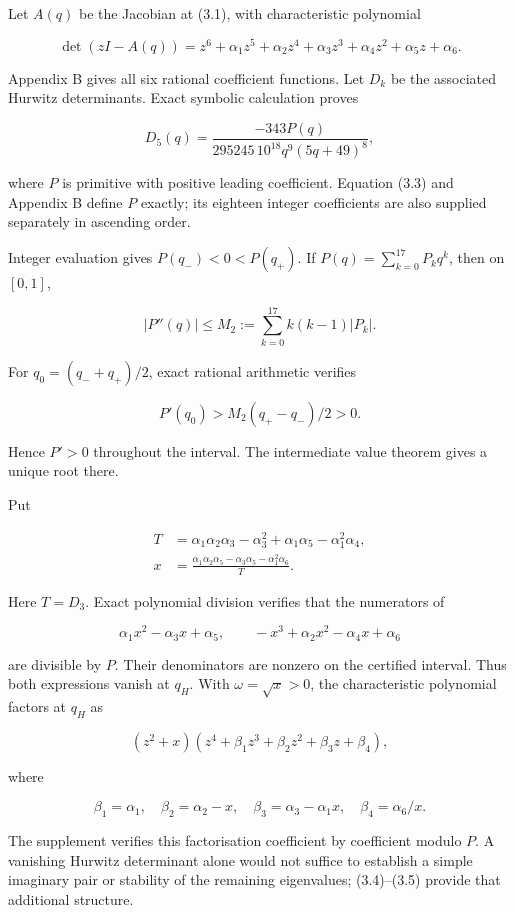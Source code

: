 \documentclass[
  11pt,
]{article}
\begin{document}
Let \(A(q)\) be the Jacobian at (3.1), with characteristic polynomial

\[
\det(zI-A(q))=z^6+\alpha_1z^5+\alpha_2z^4+\alpha_3z^3
+\alpha_4z^2+\alpha_5z+\alpha_6.
\]

Appendix B gives all six rational coefficient functions. Let \(D_k\) be
the associated Hurwitz determinants. Exact symbolic calculation proves

\[
D_5(q)=\frac{-343P(q)}{295245\,10^{18}q^9(5q+49)^8}, \tag{3.3}
\]

where \(P\) is primitive with positive leading coefficient. Equation
(3.3) and Appendix B define \(P\) exactly; its eighteen integer
coefficients are also supplied separately in ascending order.

Integer evaluation gives \(P(q_-)<0<P(q_+)\). If
\(P(q)=\sum_{k=0}^{17}P_kq^k\), then on \([0,1]\),

\[
|P''(q)|\leq M_2:=\sum_{k=0}^{17}k(k-1)|P_k|.
\]

For \(q_0=(q_-+q_+)/2\), exact rational arithmetic verifies

\[
P'(q_0)>M_2(q_+-q_-)/2>0.
\]

Hence \(P'>0\) throughout the interval. The intermediate value theorem
gives a unique root there.

Put

\[
\begin{aligned}
T&=\alpha_1\alpha_2\alpha_3-\alpha_3^2
+\alpha_1\alpha_5-\alpha_1^2\alpha_4,\\
x&=\frac{\alpha_1\alpha_2\alpha_5-\alpha_3\alpha_5-\alpha_1^2\alpha_6}{T}.
\end{aligned} \tag{3.4}
\]

Here \(T=D_3\). Exact polynomial division verifies that the numerators
of

\[
\alpha_1x^2-\alpha_3x+\alpha_5,\qquad
-x^3+\alpha_2x^2-\alpha_4x+\alpha_6
\]

are divisible by \(P\). Their denominators are nonzero on the certified
interval. Thus both expressions vanish at \(q_H\). With
\(\omega=\sqrt{x}>0\), the characteristic polynomial factors at \(q_H\)
as

\[
(z^2+x)(z^4+\beta_1z^3+\beta_2z^2+\beta_3z+\beta_4), \tag{3.5}
\]

where

\[
\beta_1=\alpha_1,\quad \beta_2=\alpha_2-x,\quad
\beta_3=\alpha_3-\alpha_1x,\quad \beta_4=\alpha_6/x.
\]

The supplement verifies this factorisation coefficient by coefficient
modulo \(P\). A vanishing Hurwitz determinant alone would not suffice to
establish a simple imaginary pair or stability of the remaining
eigenvalues; (3.4)--(3.5) provide that additional structure.
\end{document}
